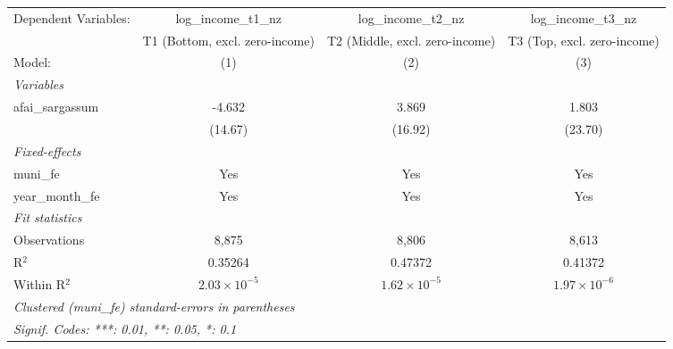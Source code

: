 \begingroup
\centering
\begin{tabular}{lccc}
   \tabularnewline \midrule \midrule
   Dependent Variables: & log\_income\_t1\_nz            & log\_income\_t2\_nz            & log\_income\_t3\_nz\\     
                        & T1 (Bottom, excl. zero-income) & T2 (Middle, excl. zero-income) & T3 (Top, excl. zero-income) \\   
   Model:               & (1)                            & (2)                            & (3)\\  
   \midrule
   \emph{Variables}\\
   afai\_sargassum      & -4.632                         & 3.869                          & 1.803\\   
                        & (14.67)                        & (16.92)                        & (23.70)\\   
   \midrule
   \emph{Fixed-effects}\\
   muni\_fe             & Yes                            & Yes                            & Yes\\  
   year\_month\_fe      & Yes                            & Yes                            & Yes\\  
   \midrule
   \emph{Fit statistics}\\
   Observations         & 8,875                          & 8,806                          & 8,613\\  
   R$^2$                & 0.35264                        & 0.47372                        & 0.41372\\  
   Within R$^2$         & $2.03\times 10^{-5}$           & $1.62\times 10^{-5}$           & $1.97\times 10^{-6}$\\   
   \midrule \midrule
   \multicolumn{4}{l}{\emph{Clustered (muni\_fe) standard-errors in parentheses}}\\
   \multicolumn{4}{l}{\emph{Signif. Codes: ***: 0.01, **: 0.05, *: 0.1}}\\
\end{tabular}
\par\endgroup
